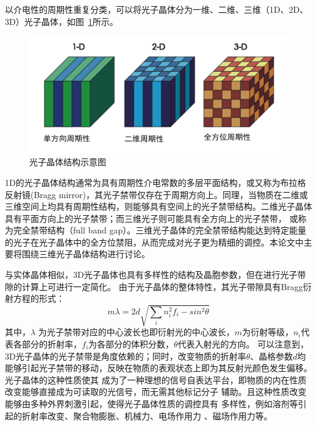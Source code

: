 以介电性的周期性重复分类，可以将光子晶体分为一维、二维、三维（1D、2D、3D）光子晶体，如图~\ref{fig:1d2d3d}所示。
\begin{figure}[htbp]
	\centering
	\includegraphics[width=0.85\linewidth]{figures/1d2d3d.png}
	\caption{光子晶体结构示意图}
	\label{fig:1d2d3d}
\end{figure}%
1D的光子晶体结构通常为具有周期性介电常数的多层平面结构，或又称为布拉格反射镜(Bragg mirror)，其光子禁带仅存在于周期方向上。同理，当物质在二维或三维空间上均具有周期性结构，则能够具有空间上的光子禁带结构。二维光子晶体具有平面方向上的光子禁带；而三维光子则可能具有全方向上的光子禁带，
或称为完全禁带结构（full band gap）。三维光子晶体的完全禁带结构能达到特定能量的光子在光子晶体中的全方位禁阻，从而完成对光子更为精细的调控。本论文中主要将围绕三维光子晶体结构进行讨论。

与实体晶体相似，3D光子晶体也具有多样性的结构及晶胞参数，但在进行光子带隙的计算上可进行一定简化。
由于光子晶体的整体特性，其光子带隙具有Bragg衍射方程的形式：
\begin{equation}
	\label{eqn:1-bragg}
	m\lambda=2d\sqrt{\sum_{i}n_i^2f_i-sin^2\theta}
\end{equation}
其中，$\lambda$ 为光子禁带对应的中心波长也即衍射光的中心波长，$m$为衍射等级，$n_i$代表各部分的折射率，$f_i$为各部分的体积分数，$\theta$代表入射光的方向。
可以注意到，3D光子晶体的光子禁带是角度依赖的；同时，改变物质的折射率$\theta$、晶格参数$d$均能够引起光子禁带的移动，反映在物质的表观状态上即为其反射光颜色发生偏移。光子晶体的这种性质使其
成为了一种理想的信号自表达平台，即物质的内在性质改变能够直接成为可读取的光信号，而无需其他标记分子
辅助。且这种性质改变能够由多种外界刺激引起，使得光子晶体性质的调控具有
多样性，例如溶剂等引起的折射率改变\cite{Higashiguchi2012SolventResponsive,Wang2011Size}、聚合物膨胀\cite{Fudouzi2003Colloidal}、机械力\cite{Haque2011Rapid,Wang2014Robust}、电场作用力\cite{Arsenault2007PhotonicCrystal,Han2014Structural} 、磁场作用力\cite{Ge2009Magnetochromatic,Caicedo2011Magnetophotonic}等。


